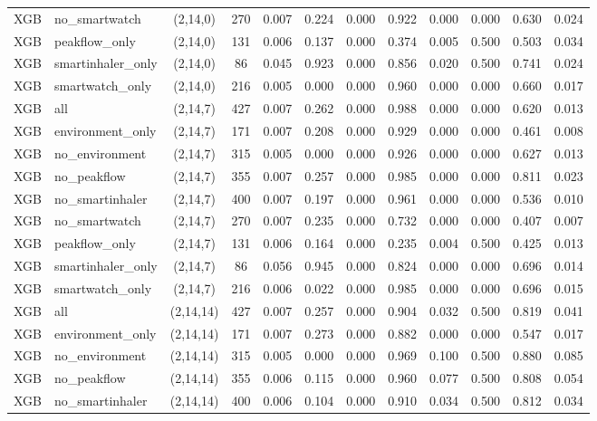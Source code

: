 \begin{longtable}{llcccccccccc}
XGB & no\_smartwatch & (2,14,0) & 270 & 0.007 & 0.224 & 0.000 & 0.922 & 0.000 & 0.000 & 0.630 & 0.024 \\
XGB & peakflow\_only & (2,14,0) & 131 & 0.006 & 0.137 & 0.000 & 0.374 & 0.005 & 0.500 & 0.503 & 0.034 \\
XGB & smartinhaler\_only & (2,14,0) & 86 & 0.045 & 0.923 & 0.000 & 0.856 & 0.020 & 0.500 & 0.741 & 0.024 \\
XGB & smartwatch\_only & (2,14,0) & 216 & 0.005 & 0.000 & 0.000 & 0.960 & 0.000 & 0.000 & 0.660 & 0.017 \\
XGB & all & (2,14,7) & 427 & 0.007 & 0.262 & 0.000 & 0.988 & 0.000 & 0.000 & 0.620 & 0.013 \\
XGB & environment\_only & (2,14,7) & 171 & 0.007 & 0.208 & 0.000 & 0.929 & 0.000 & 0.000 & 0.461 & 0.008 \\
XGB & no\_environment & (2,14,7) & 315 & 0.005 & 0.000 & 0.000 & 0.926 & 0.000 & 0.000 & 0.627 & 0.013 \\
XGB & no\_peakflow & (2,14,7) & 355 & 0.007 & 0.257 & 0.000 & 0.985 & 0.000 & 0.000 & 0.811 & 0.023 \\
XGB & no\_smartinhaler & (2,14,7) & 400 & 0.007 & 0.197 & 0.000 & 0.961 & 0.000 & 0.000 & 0.536 & 0.010 \\
XGB & no\_smartwatch & (2,14,7) & 270 & 0.007 & 0.235 & 0.000 & 0.732 & 0.000 & 0.000 & 0.407 & 0.007 \\
XGB & peakflow\_only & (2,14,7) & 131 & 0.006 & 0.164 & 0.000 & 0.235 & 0.004 & 0.500 & 0.425 & 0.013 \\
XGB & smartinhaler\_only & (2,14,7) & 86 & 0.056 & 0.945 & 0.000 & 0.824 & 0.000 & 0.000 & 0.696 & 0.014 \\
XGB & smartwatch\_only & (2,14,7) & 216 & 0.006 & 0.022 & 0.000 & 0.985 & 0.000 & 0.000 & 0.696 & 0.015 \\
XGB & all & (2,14,14) & 427 & 0.007 & 0.257 & 0.000 & 0.904 & 0.032 & 0.500 & 0.819 & 0.041 \\
XGB & environment\_only & (2,14,14) & 171 & 0.007 & 0.273 & 0.000 & 0.882 & 0.000 & 0.000 & 0.547 & 0.017 \\
XGB & no\_environment & (2,14,14) & 315 & 0.005 & 0.000 & 0.000 & 0.969 & 0.100 & 0.500 & 0.880 & 0.085 \\
XGB & no\_peakflow & (2,14,14) & 355 & 0.006 & 0.115 & 0.000 & 0.960 & 0.077 & 0.500 & 0.808 & 0.054 \\
XGB & no\_smartinhaler & (2,14,14) & 400 & 0.006 & 0.104 & 0.000 & 0.910 & 0.034 & 0.500 & 0.812 & 0.034 \\

\end{longtable}
